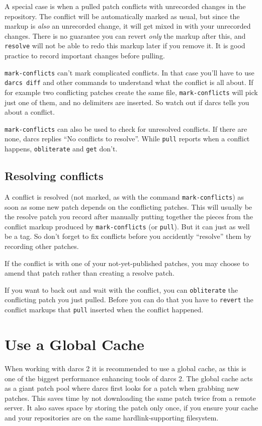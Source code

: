 A special case is when a pulled patch conflicts with unrecorded changes in the repository.
The conflict will be automatically marked as usual,
but since the markup is \emph{also} an unrecorded change,
it will get mixed in with your unrecorded changes.
There is no guarantee you can revert \emph{only} the markup after this,
and \verb|resolve| will not be able to redo this markup later if you remove it.
It is good practice to record important changes before pulling.

\verb|mark-conflicts| can't mark complicated conflicts.
In that case you'll have to use \verb|darcs diff| and other commands
to understand what the conflict is all about.
If for example two conflicting patches create the same file,
\verb|mark-conflicts| will pick just one of them,
and no delimiters are inserted.
So watch out if darcs tells you about a conflict.

\verb|mark-conflicts| can also be used to check for unresolved conflicts.
If there are none, darcs replies ``No conflicts to resolve''.
While \verb|pull| reports when a conflict happens,
\verb|obliterate| and \verb|get| don't.


\subsection{Resolving conflicts}

A conflict is resolved
(not marked, as with the command \verb|mark-conflicts|)
as soon as some new patch depends on the conflicting patches.
This will usually be the resolve patch you record after manually putting together the pieces
from the conflict markup produced by \verb|mark-conflicts| (or \verb|pull|).
But it can just as well be a tag.
So don't forget to fix conflicts before you accidently ``resolve'' them by recording other patches.

If the conflict is with one of your not-yet-published patches,
you may choose to amend that patch rather than creating a resolve patch.

If you want to back out and wait with the conflict,
you can \verb|obliterate| the conflicting patch you just pulled.
Before you can do that you have to \verb|revert| the conflict markups
that \verb|pull| inserted when the conflict happened.

\section{Use a Global Cache}

When working with darcs 2 it is recommended to use a global cache, as this
is one of the biggest performance enhancing tools of darcs 2.  The global
cache acts as a giant patch pool where darcs first looks for a patch when
grabbing new patches. This saves time by not downloading the same patch
twice from a remote server. It also saves space by storing the patch only
once, if you ensure your cache and your repositories are on the same
hardlink-supporting filesystem. 

